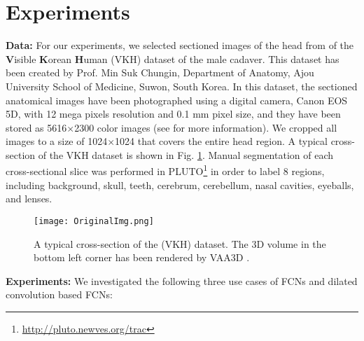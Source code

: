 \documentclass[a4paper]{mva_style}
\begin{document}
\section{Experiments}
\label{sec:results}
\textbf{Data:} For our experiments, we selected sectioned images of the head from of the \textbf{V}isible \textbf{K}orean \textbf{H}uman (VKH) dataset of the male cadaver. This dataset has been created by Prof. Min Suk Chungin, Department of Anatomy, Ajou University School of Medicine, Suwon, South Korea. In this dataset, the sectioned anatomical images have been photographed using a digital camera, Canon EOS 5D, with 12 mega pixels resolution and 0.1 mm pixel size, and they have been stored as 5616$\times$2300 color images (see \cite{VKPhome} for more information). We cropped all images to a size of 1024$\times$1024 that covers the entire head region. A typical cross-section of the VKH dataset is shown in Fig. \ref{fig:originalImg}. Manual segmentation of each cross-sectional slice was performed in PLUTO\footnote{\url{http://pluto.newves.org/trac}} in order to label 8 regions, including background, skull, teeth, cerebrum, cerebellum, nasal cavities, eyeballs, and lenses. 

\begin{figure}[H]
\begin{minipage}[b]{1\linewidth}
  \centering
    \centerline{\texttt{[image: OriginalImg.png]}}
  \end{minipage}
\caption{A typical cross-section of the (VKH) dataset. The 3D volume in the bottom left corner has been rendered by VAA3D \cite{vaa3d}.}
\label{fig:originalImg}
\end{figure}
\textbf{Experiments:} We investigated the following three use cases of FCNs and dilated convolution based FCNs:
\end{document}
